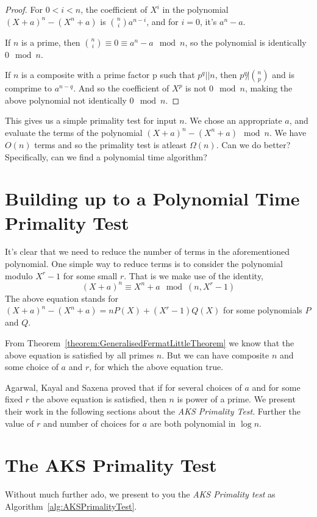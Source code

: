\documentclass[11pt]{article}
\begin{document}
\begin{proof}
For $0 < i < n$, the coefficient of $X^i$ in the polynomial $(X+a)^n - (X^n + a)$ is ${n \choose i} a^{n-i}$, and for $i = 0$, it's $a^n - a$.

If $n$ is a prime, then ${n \choose i} \equiv 0 \equiv a^n - a \mod n$, so the polynomial is identically $0 \mod n$.

If $n$ is a composite with a prime factor p such that $p^q || n$, then $p^q \not | {n \choose p}$ and is comprime to $a^{n-q}$.
And so the coefficient of $X^p$ is not $0 \mod n$, making the above polynomial not identically $0 \mod n$.
\end{proof}
This gives us a simple primality test for input $n$. We chose an appropriate $a$, and evaluate the terms of the polynomial $(X+a)^n -(X^n + a) \mod n$. We have $O(n)$ terms and so the primality test is atleast $\Omega(n)$. Can we do better? Specifically, can we find a polynomial time algorithm?

\section {Building up to a Polynomial Time Primality Test}
It's clear that we need to reduce the number of terms in the aforementioned polynomial. One simple way to reduce terms is to consider the polynomial modulo $X^r - 1$ for some small $r$. That is we make use of the identity,
\[(X+a)^n \equiv X^n + a \mod (n, X^r - 1)\] 
The above equation stands for $(X+a)^n - (X^n + a) = nP(X) + (X^r - 1)Q(X)$ for some polynomials $P$ and $Q$.

From Theorem~\ref{theorem:GeneralisedFermatLittleTheorem} we know that the above equation is satisfied by all primes $n$. But we can have composite $n$ and some choice of $a$ and $r$, for which the above equation true. 

Agarwal, Kayal and Saxena proved that if for several choices of $a$ and for some fixed $r$ the above equation is satisfied, then $n$ is power of a prime. We present their work in the following sections about the \emph{AKS Primality Test}. Further the value of $r$ and number of choices for $a$ are both polynomial in $\log n$.

\section {The AKS Primality Test}
Without much further ado, we present to you the \emph{AKS Primality test} as Algorithm~\ref{alg:AKSPrimalityTest}.
\end{document}
